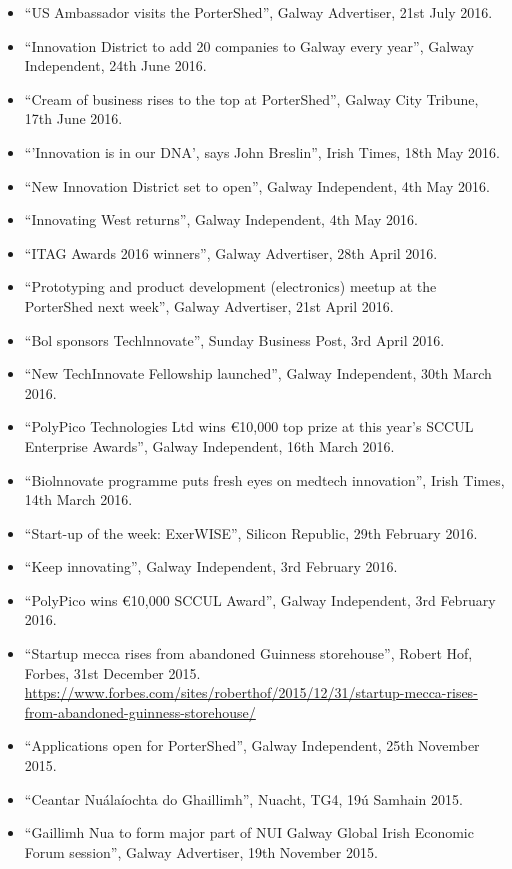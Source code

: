 \documentclass[10pt,a4paper]{res} %
\begin{document}
\begin{resume}
{\begin{itemize}
\item ``US Ambassador visits the PorterShed'', Galway Advertiser, 21st July 2016.
\item ``Innovation District to add 20 companies to Galway every year'', Galway Independent, 24th June 2016.
\item ``Cream of business rises to the top at PorterShed'', Galway City Tribune, 17th June 2016.
\item ``'Innovation is in our DNA', says John Breslin'', Irish Times, 18th May 2016.
\item ``New Innovation District set to open'', Galway Independent, 4th May 2016.
\item ``Innovating West returns'', Galway Independent, 4th May 2016.
\item ``ITAG Awards 2016 winners'', Galway Advertiser, 28th April 2016.
\item ``Prototyping and product development (electronics) meetup at the PorterShed next week'', Galway Advertiser, 21st April 2016.
\item ``Bol sponsors Techlnnovate'', Sunday Business Post, 3rd April 2016.
\item ``New TechInnovate Fellowship launched'', Galway Independent, 30th March 2016.
\item ``PolyPico Technologies Ltd wins \euro{}10,000 top prize at this year's SCCUL Enterprise Awards'', Galway Independent, 16th March 2016.
\item ``Biolnnovate programme puts fresh eyes on medtech innovation'', Irish Times, 14th March 2016.
\item ``Start-up of the week: ExerWISE'', Silicon Republic, 29th February 2016.
\item ``Keep innovating'', Galway Independent, 3rd February 2016.
\item ``PolyPico wins \euro{}10,000 SCCUL Award'', Galway Independent, 3rd February 2016.
\item ``Startup mecca rises from abandoned Guinness storehouse'', Robert Hof, Forbes, 31st December 2015. \url{https://www.forbes.com/sites/roberthof/2015/12/31/startup-mecca-rises-from-abandoned-guinness-storehouse/}
\item ``Applications open for PorterShed'', Galway Independent, 25th November 2015.
\item ``Ceantar Nu\'{a}la\'{i}ochta do Ghaillimh'', Nuacht, TG4, 19\'{u} Samhain 2015.
\item ``Gaillimh Nua to form major part of NUI Galway Global Irish Economic Forum session'', Galway Advertiser, 19th November 2015.

\end{itemize}}
\end{resume}
\end{document}
